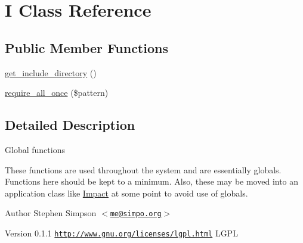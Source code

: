 \hypertarget{classI}{
\section{I Class Reference}
\label{classI}
}
\subsection*{Public Member Functions}
\begin{DoxyCompactItemize}
\item 
\hyperlink{classI_ad0abe98dc00be95f647b055b6ad2ab49}{get\_\-include\_\-directory} ()
\item 
\hyperlink{classI_a5601b98f14b2b75257d3ceead500f723}{require\_\-all\_\-once} (\$pattern)
\end{DoxyCompactItemize}


\subsection{Detailed Description}
Global functions

These functions are used throughout the system and are essentially globals. Functions here should be kept to a minimum. Also, these may be moved into an application class like \hyperlink{namespaceImpact}{Impact} at some point to avoid use of globals.

\begin{DoxyAuthor}{Author}
Stephen Simpson $<$\href{mailto:me@simpo.org}{\tt me@simpo.org}$>$ 
\end{DoxyAuthor}
\begin{DoxyVersion}{Version}
0.1.1  \href{http://www.gnu.org/licenses/lgpl.html}{\tt http://www.gnu.org/licenses/lgpl.html} LGPL 
\end{DoxyVersion}



